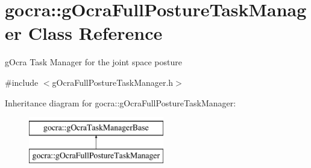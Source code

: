 \hypertarget{classgocra_1_1gOcraFullPostureTaskManager}{}\section{gocra\+:\+:g\+Ocra\+Full\+Posture\+Task\+Manager Class Reference}
\label{classgocra_1_1gOcraFullPostureTaskManager}


g\+Ocra Task Manager for the joint space posture  




{\ttfamily \#include $<$g\+Ocra\+Full\+Posture\+Task\+Manager.\+h$>$}

Inheritance diagram for gocra\+:\+:g\+Ocra\+Full\+Posture\+Task\+Manager\+:\begin{figure}[H]
\begin{center}
\leavevmode
\includegraphics[height=2.000000cm]{d5/db1/classgocra_1_1gOcraFullPostureTaskManager}
\end{center}
\end{figure}
